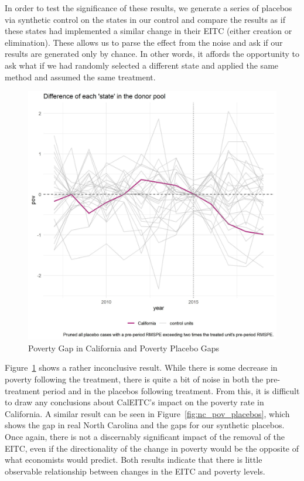 \documentclass{article}
\begin{document}
In order to test the significance of these results, we generate a series of placebos via synthetic control on the states in our control and compare the results as if these states had implemented a similar change in their EITC (either creation or elimination). These allows us to parse the effect from the noise and ask if our results are generated only by chance. In other words, it affords the opportunity to ask what if we had randomly selected a different state and applied the same method and assumed the same treatment. 


 \begin{figure}[H]
    \caption{Poverty Gap in California and Poverty Placebo Gaps}
    \begin{center}
        \includegraphics[width=.85\textwidth]{ca_pov_placebos}
    \end{center}
    \label{fig:ca_pov_placebos}{}
\end{figure}

Figure~\ref{fig:ca_pov_placebos} shows a rather inconclusive result. While there is some decrease in poverty following the treatment, there is quite a bit of noise in both the pre-treatment period and in the placebos following treatment. From this, it is difficult to draw any conclusions about CalEITC's impact on the poverty rate in California. A similar result can be seen in Figure~\ref{fig:nc_pov_placebos}, which shows the gap in real North Carolina and the gaps for our synthetic placebos. Once again, there is not a discernably significant impact of the removal of the EITC, even if the directionality of the change in poverty would be the opposite of what economists would predict. Both results indicate that there is little observable relationship between changes in the EITC and poverty levels. 
\end{document}
